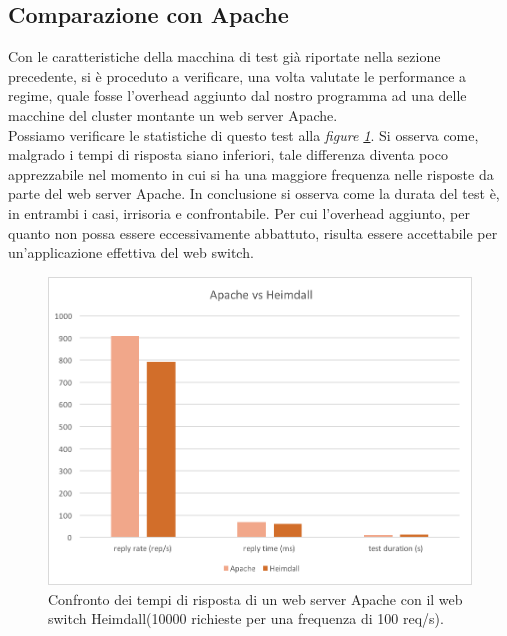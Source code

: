\documentclass[italian]{tktltiki2}
\begin{document}
\subsection{Comparazione con Apache}
Con le caratteristiche della macchina di test già riportate nella sezione precedente, si è proceduto a verificare, una volta valutate le performance a regime, quale fosse l'overhead aggiunto dal nostro programma ad una delle macchine del cluster montante un web server Apache. \\
Possiamo verificare le statistiche di questo test alla \emph{figure \ref{fig: apachevsheimdall}}. Si osserva come, malgrado i tempi di risposta siano inferiori, tale differenza diventa poco apprezzabile nel momento in cui si ha una maggiore frequenza nelle risposte da parte del web server Apache. In conclusione si osserva come la durata del test è, in entrambi i casi, irrisoria e confrontabile. Per cui l'overhead aggiunto, per quanto non possa essere eccessivamente abbattuto, risulta essere accettabile per un'applicazione effettiva del web switch.
\begin{figure}[H]
\centering
\includegraphics[width=\textwidth]{images/apachevsheimdall}
\caption{Confronto dei tempi di risposta di un web server Apache con il web switch Heimdall(10000 richieste per una frequenza di 100 req/s).\label{fig: apachevsheimdall}}
\end{figure}
\end{document}
